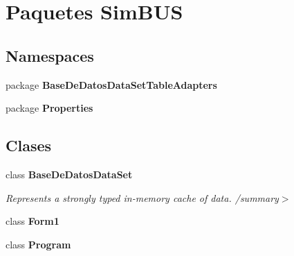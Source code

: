 \section{Paquetes Sim\-B\-U\-S}
\label{namespace_sim_b_u_s}
\subsection*{Namespaces}
\begin{DoxyCompactItemize}
\item 
package {\bf Base\-De\-Datos\-Data\-Set\-Table\-Adapters}
\item 
package {\bf Properties}
\end{DoxyCompactItemize}
\subsection*{Clases}
\begin{DoxyCompactItemize}
\item 
class {\bf Base\-De\-Datos\-Data\-Set}
\begin{DoxyCompactList}\small\item\em Represents a strongly typed in-\/memory cache of data. /summary$>$ \end{DoxyCompactList}\item 
class {\bf Form1}
\item 
class {\bf Program}
\end{DoxyCompactItemize}
